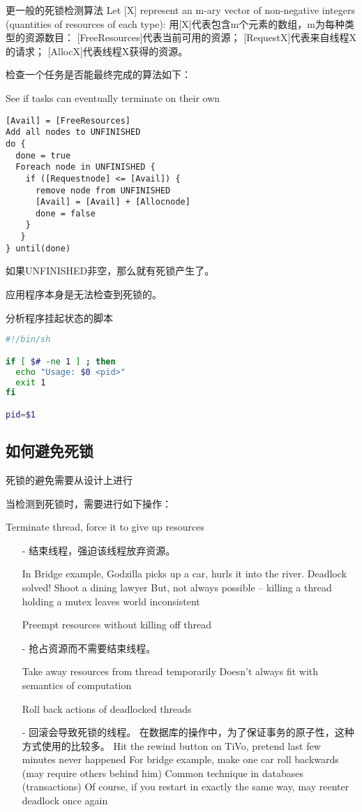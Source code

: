 更一般的死锁检测算法
Let [X] represent an m-ary vector of non-negative 
integers (quantities of resources of each type):
    用[X]代表包含m个元素的数组，m为每种类型的资源数目：
    [FreeResources]代表当前可用的资源；
    [RequestX]代表来自线程X的请求；
    [AllocX]代表线程X获得的资源。

    检查一个任务是否能最终完成的算法如下：
        
See if tasks can eventually terminate on their own

\begin{lstlisting}
[Avail] = [FreeResources] 
Add all nodes to UNFINISHED 	
do {
  done = true
  Foreach node in UNFINISHED {	
    if ([Requestnode] <= [Avail]) {
      remove node from UNFINISHED
      [Avail] = [Avail] + [Allocnode]
      done = false
    }
   }
} until(done)				
\end{lstlisting}
如果UNFINISHED非空，那么就有死锁产生了。


应用程序本身是无法检查到死锁的。

\begin{table}
\caption{分析程序挂起状态的脚本}
\begin{lstlisting}[language={sh}]
#!/bin/sh

if [ $# -ne 1 ] ; then
  echo "Usage: $0 <pid>"
  exit 1
fi

pid=$1

\end{lstlisting}
\end{table}

\subsection{如何避免死锁}
死锁的避免需要从设计上进行

当检测到死锁时，需要进行如下操作：

Terminate thread, force it to give up resources
\begin{itemize}
\item[-]结束线程，强迫该线程放弃资源。

In Bridge example, Godzilla picks up a car, hurls it into the river.  Deadlock solved!
Shoot a dining lawyer
But, not always possible – killing a thread holding a mutex leaves world inconsistent

Preempt resources without killing off thread 
\item[-]抢占资源而不需要结束线程。

Take away resources from thread temporarily
Doesn’t always fit with semantics of computation

Roll back actions of deadlocked threads 
\item[-]回滚会导致死锁的线程。
在数据库的操作中，为了保证事务的原子性，这种方式使用的比较多。
    Hit the rewind button on TiVo, pretend last few minutes never happened
For bridge example, make one car roll backwards (may require others behind him)
Common technique in databases (transactions)
Of course, if you restart in exactly the same way, may reenter deadlock once again

\end{itemize}


